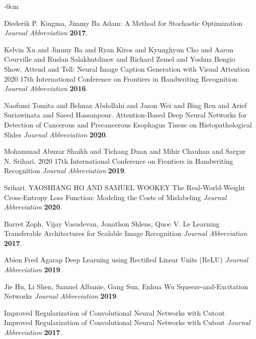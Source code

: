 \documentclass[sensors,article,submit,pdftex,moreauthors]{Definitions/mdpi}
\begin{document}
\begin{adjustwidth}{-\extralength}{0cm}
\begin{thebibliography}{999}
Diederik P. Kingma, Jimmy Ba Adam: A Method for Stochastic Optimization
{\em Journal Abbreviation} 
{\bf 2017}.

Kelvin Xu and Jimmy Ba and Ryan Kiros and Kyunghyun Cho and Aaron Courville and Ruslan Salakhutdinov and Richard Zemel and Yoshua Bengio Show, Attend and Tell: Neural Image Caption Generation with Visual Attention 2020 17th International Conference on Frontiers in Handwriting Recognition
{\em Journal Abbreviation} 
{\bf 2016}.

Naofumi Tomita and Behnaz Abdollahi and Jason Wei and Bing Ren and Arief Suriawinata and Saeed Hassanpour. Attention-Based Deep Neural Networks for Detection of Cancerous and Precancerous Esophagus Tissue on Histopathological Slides
{\em Journal Abbreviation} 
{\bf 2020}.

Mohammad Abuzar Shaikh and Tiehang Duan and Mihir Chauhan and Sargur N. Srihari. 2020 17th International Conference on Frontiers in Handwriting Recognition
{\em Journal Abbreviation} 
{\bf 2019}.

Srihari. YAOSHIANG HO AND SAMUEL WOOKEY The Real-World-Weight Cross-Entropy Loss Function: Modeling the Costs of Mislabeling 
{\em Journal Abbreviation} 
{\bf 2020}.

Barret Zoph, Vijay Vasudevan, Jonathon Shlens, Quoc V. Le Learning Transferable Architectures for Scalable Image Recognition 
{\em Journal Abbreviation} 
{\bf 2017}.

Abien Fred Agarap Deep Learning using Rectified Linear Units (ReLU) 
{\em Journal Abbreviation} 
{\bf 2019}.

Jie Hu, Li Shen, Samuel Albanie, Gang Sun, Enhua Wu Squeeze-and-Excitation Networks 
{\em Journal Abbreviation} 
{\bf 2019}.

Improved Regularization of Convolutional Neural Networks with Cutout Improved Regularization of Convolutional Neural Networks with Cutout 
{\em Journal Abbreviation} 
{\bf 2017}.

\end{thebibliography}

%


\end{adjustwidth}
\end{document}
